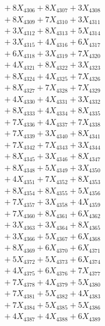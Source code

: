 \documentclass[a4paper,10pt]{article}
\begin{document}
{\begin{align}
&\;  + 8 X_{4306} + 8 X_{4307} + 3 X_{4308} \\[0.3ex]
&\;  + 8 X_{4309} + 7 X_{4310} + 3 X_{4311} \\[0.3ex]
&\;  + 3 X_{4312} + 8 X_{4313} + 5 X_{4314} \\[0.3ex]
&\;  + 3 X_{4315} + 4 X_{4316} + 6 X_{4317} \\[0.3ex]
&\;  + 6 X_{4318} + 3 X_{4319} + 7 X_{4320} \\[0.3ex]
&\;  + 4 X_{4321} + 8 X_{4322} + 3 X_{4323} \\[0.3ex]
&\;  + 8 X_{4324} + 4 X_{4325} + 7 X_{4326} \\[0.3ex]
&\;  + 8 X_{4327} + 7 X_{4328} + 7 X_{4329} \\[0.5ex]\allowbreak
&\;  + 4 X_{4330} + 4 X_{4331} + 3 X_{4332} \\[0.3ex]
&\;  + 8 X_{4333} + 4 X_{4334} + 8 X_{4335} \\[0.3ex]
&\;  + 7 X_{4336} + 4 X_{4337} + 7 X_{4338} \\[0.3ex]
&\;  + 7 X_{4339} + 3 X_{4340} + 8 X_{4341} \\[0.3ex]
&\;  + 7 X_{4342} + 7 X_{4343} + 3 X_{4344} \\[0.3ex]
&\;  + 8 X_{4345} + 3 X_{4346} + 8 X_{4347} \\[0.3ex]
&\;  + 8 X_{4348} + 5 X_{4349} + 3 X_{4350} \\[0.3ex]
&\;  + 4 X_{4351} + 7 X_{4352} + 8 X_{4353} \\[0.3ex]
&\;  + 8 X_{4354} + 8 X_{4355} + 5 X_{4356} \\[0.3ex]
&\;  + 7 X_{4357} + 3 X_{4358} + 4 X_{4359} \\[0.5ex]\allowbreak
&\;  + 7 X_{4360} + 8 X_{4361} + 6 X_{4362} \\[0.3ex]
&\;  + 3 X_{4363} + 3 X_{4364} + 8 X_{4365} \\[0.3ex]
&\;  + 3 X_{4366} + 5 X_{4367} + 6 X_{4368} \\[0.3ex]
&\;  + 8 X_{4369} + 6 X_{4370} + 6 X_{4371} \\[0.3ex]
&\;  + 5 X_{4372} + 5 X_{4373} + 6 X_{4374} \\[0.3ex]
&\;  + 4 X_{4375} + 6 X_{4376} + 7 X_{4377} \\[0.3ex]
&\;  + 7 X_{4378} + 4 X_{4379} + 5 X_{4380} \\[0.3ex]
&\;  + 7 X_{4381} + 5 X_{4382} + 4 X_{4383} \\[0.3ex]
&\;  + 7 X_{4384} + 5 X_{4385} + 5 X_{4386} \\[0.3ex]
&\;  + 4 X_{4387} + 4 X_{4388} + 6 X_{4389} \\[0.5ex]\allowbreak

\end{align}}
\end{document}
